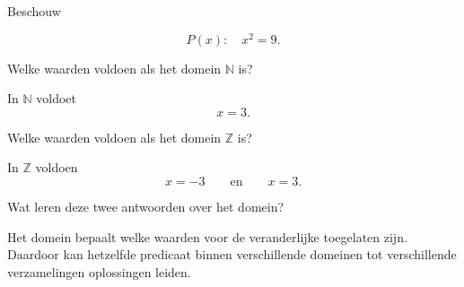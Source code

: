 \documentclass{ximera}
\begin{document}
\begin{oefening}{\oefB \ESS}

Beschouw

\[
P(x):\quad x^2=9.
\]

\begin{question}
Welke waarden voldoen als het domein $\mathbb{N}$ is?

\begin{oplossing}
In $\mathbb{N}$ voldoet
\[
x=3.
\]
\end{oplossing}
\end{question}


\begin{question}
Welke waarden voldoen als het domein $\mathbb{Z}$ is?

\begin{oplossing}
In $\mathbb{Z}$ voldoen
\[
x=-3
\qquad\text{en}\qquad
x=3.
\]
\end{oplossing}
\end{question}


\begin{question}
Wat leren deze twee antwoorden over het domein?

\begin{oplossing}
Het domein bepaalt welke waarden voor de veranderlijke toegelaten zijn.
Daardoor kan hetzelfde predicaat binnen verschillende domeinen tot
verschillende verzamelingen oplossingen leiden.
\end{oplossing}
\end{question}

\end{oefening}
\end{document}
